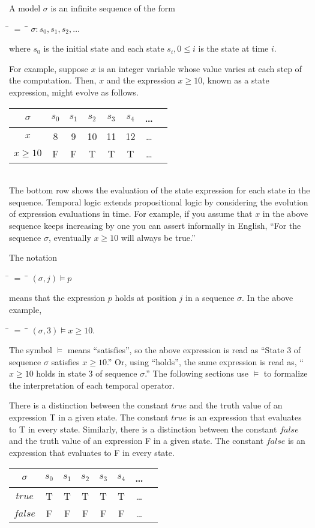 \documentclass[12pt, fleqn, leqno]{article}
\newcommand{\lllgap}{12pt}                          %
\newcommand{\mymathindent}{24pt}                    %
\newcommand{\myqedtab}{\hspace{384pt}}              %
\begin{document}
A model $\sigma$ is an infinite sequence of the form
\begin{tabbing}
\hspace{\mymathindent} \= $= \;$ \= \myqedtab \= \kill
  \> $\sigma: s_0, s_1, s_2, \dots$
\end{tabbing}
where $s_0$ is the initial state and each state $s_i, 0 \le i$ is the state at time $i$.

For example, suppose $x$ is an integer variable whose value varies at each step of the computation.
Then, $x$ and the expression $x\ge 10$, known as a state expression, might evolve as follows.\\[\lllgap]
\begin{tabular}{c|ccccccc}
  $\sigma$      & $s_0$ & $s_1$ & $s_2$ & $s_3$ & $s_4$ & \dots \\
  \hline
  $x$           & 8     & 9     & 10    & 11    & 12    & \dots\\
  $x\ge 10$     & F     & F     & T     & T     & T     & \dots
\end{tabular}\\[\lllgap]
The bottom row shows the evaluation of the state expression for each state in the sequence.
Temporal logic extends propositional logic by considering the evolution of expression evaluations in time.
For example, if you assume that $x$ in the above sequence keeps increasing by one you can assert
informally in English, ``For the sequence $\sigma$, eventually $x\ge 10$ will always be true.''

The notation
\begin{tabbing}
\hspace{\mymathindent} \= $= \;$ \= \myqedtab \= \kill
  \> $(\sigma, j) \models p$
\end{tabbing}
means that the expression $p$ holds at position $j$ in a sequence $\sigma$.
In the above example,
\begin{tabbing}
\hspace{\mymathindent} \= $= \;$ \= \myqedtab \= \kill
  \> $(\sigma, 3) \models x\ge 10$.
\end{tabbing}
The symbol $\models$ means ``satisfies'', so the above expression is read as
``State 3 of sequence $\sigma$ satisfies $x\ge 10$.''
Or, using ``holds'', the same expression is read as, ``$x\ge 10$ holds in state 3 of sequence $\sigma$.''
The following sections use $\models$ to formalize the interpretation of each temporal operator.

There is a distinction between the constant $true$ and the truth value of an expression T in a given state.
The constant $true$ is an expression that evaluates to T in every state.
Similarly, there is a distinction between the constant $false$ and the truth value of an expression F in a given state.
The constant $false$ is an expression that evaluates to F in every state.\\[\lllgap]
\begin{tabular}{c|ccccccc}
  $\sigma$      & $s_0$ & $s_1$ & $s_2$ & $s_3$ & $s_4$ & \dots \\
  \hline
  $true$        & T     & T     & T     & T     & T     & \dots\\
  $false$       & F     & F     & F     & F     & F     & \dots
\end{tabular}
\end{document}

